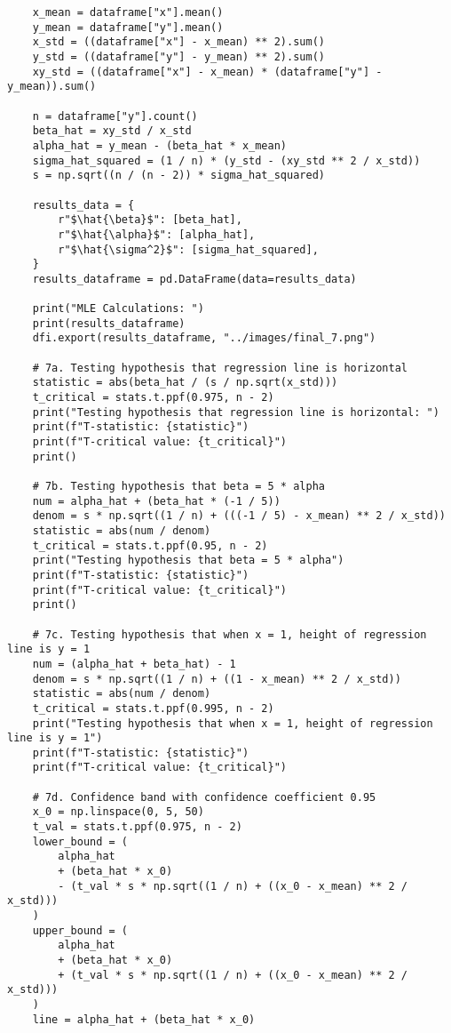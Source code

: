 \documentclass[letterpaper, 12pt]{article}
\begin{document}
\begin{lstlisting}
    x_mean = dataframe["x"].mean()
    y_mean = dataframe["y"].mean()
    x_std = ((dataframe["x"] - x_mean) ** 2).sum()
    y_std = ((dataframe["y"] - y_mean) ** 2).sum()
    xy_std = ((dataframe["x"] - x_mean) * (dataframe["y"] - y_mean)).sum()

    n = dataframe["y"].count()
    beta_hat = xy_std / x_std
    alpha_hat = y_mean - (beta_hat * x_mean)
    sigma_hat_squared = (1 / n) * (y_std - (xy_std ** 2 / x_std))
    s = np.sqrt((n / (n - 2)) * sigma_hat_squared)

    results_data = {
        r"$\hat{\beta}$": [beta_hat],
        r"$\hat{\alpha}$": [alpha_hat],
        r"$\hat{\sigma^2}$": [sigma_hat_squared],
    }
    results_dataframe = pd.DataFrame(data=results_data)

    print("MLE Calculations: ")
    print(results_dataframe)
    dfi.export(results_dataframe, "../images/final_7.png")

    # 7a. Testing hypothesis that regression line is horizontal
    statistic = abs(beta_hat / (s / np.sqrt(x_std)))
    t_critical = stats.t.ppf(0.975, n - 2)
    print("Testing hypothesis that regression line is horizontal: ")
    print(f"T-statistic: {statistic}")
    print(f"T-critical value: {t_critical}")
    print()

    # 7b. Testing hypothesis that beta = 5 * alpha
    num = alpha_hat + (beta_hat * (-1 / 5))
    denom = s * np.sqrt((1 / n) + (((-1 / 5) - x_mean) ** 2 / x_std))
    statistic = abs(num / denom)
    t_critical = stats.t.ppf(0.95, n - 2)
    print("Testing hypothesis that beta = 5 * alpha")
    print(f"T-statistic: {statistic}")
    print(f"T-critical value: {t_critical}")
    print()

    # 7c. Testing hypothesis that when x = 1, height of regression line is y = 1
    num = (alpha_hat + beta_hat) - 1
    denom = s * np.sqrt((1 / n) + ((1 - x_mean) ** 2 / x_std))
    statistic = abs(num / denom)
    t_critical = stats.t.ppf(0.995, n - 2)
    print("Testing hypothesis that when x = 1, height of regression line is y = 1")
    print(f"T-statistic: {statistic}")
    print(f"T-critical value: {t_critical}")

    # 7d. Confidence band with confidence coefficient 0.95
    x_0 = np.linspace(0, 5, 50)
    t_val = stats.t.ppf(0.975, n - 2)
    lower_bound = (
        alpha_hat
        + (beta_hat * x_0)
        - (t_val * s * np.sqrt((1 / n) + ((x_0 - x_mean) ** 2 / x_std)))
    )
    upper_bound = (
        alpha_hat
        + (beta_hat * x_0)
        + (t_val * s * np.sqrt((1 / n) + ((x_0 - x_mean) ** 2 / x_std)))
    )
    line = alpha_hat + (beta_hat * x_0)


\end{lstlisting}
\end{document}
